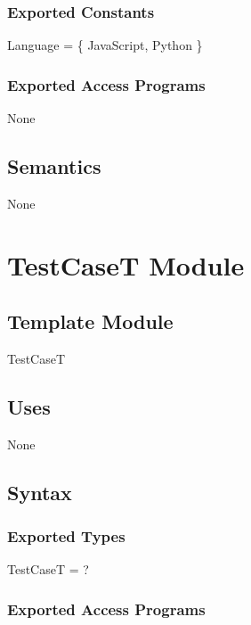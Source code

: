 \documentclass[12pt, titlepage]{article}
\begin{document}
\subsubsection{Exported Constants}

Language = \{ JavaScript, Python \}

\subsubsection{Exported Access Programs}
None


\subsection{Semantics}

None



\newpage

\section{TestCaseT Module} \label{TestCaseT} 

\subsection{Template Module}

TestCaseT

\subsection{Uses}

None

\subsection{Syntax}

\subsubsection{Exported Types}

TestCaseT = ?

\subsubsection{Exported Access Programs}
\end{document}
